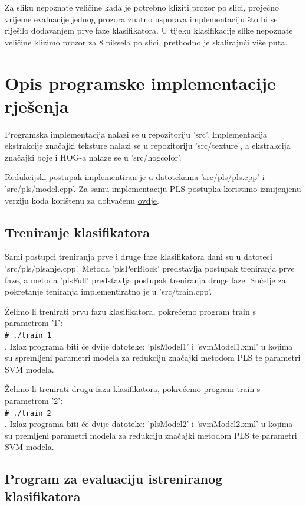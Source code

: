 \documentclass[seminar]{fer}
\newcommand{\shellcmd}[1]{\\\indent\indent\texttt{\footnotesize\# #1}\\}
\begin{document}
Za sliku nepoznate veličine kada je potrebno kliziti prozor po slici, proječno vrijeme evaluacije jednog prozora znatno usporava implementaciju što bi se riješilo dodavanjem prve faze klasifikatora. U tijeku klasifikacije slike nepoznate veličine klizimo prozor za $8$ piksela po slici, prethodno je skalirajući više puta.

\chapter{Opis programske implementacije rješenja}
Programska implementacija nalazi se u repozitoriju 'src'. Implementacija ekstrakcije značajki teksture nalazi se u repozitoriju 'src/texture', a ekstrakcija značajki boje i HOG-a nalaze se u 'src/hogcolor'. 

Redukcijski postupak implementiran je u datotekama 'src/pls/pls.cpp' i 'src/pls/model.cpp'. Za samu implementaciju PLS postupka koristimo izmijenjenu verziju koda korištenu za \cite{Schwartz} dohvaćenu   \href{http://homepages.dcc.ufmg.br/~william/softwares.html#PLSNipals}{ovdje}.

\section{Treniranje klasifikatora}

Sami postupci treniranja prve i druge faze klasifikatora dani su u datoteci 'src/pls/plsanje.cpp'. Metoda 'plsPerBlock' predstavlja postupak treniranja prve faze, a metoda 'plsFull' predstavlja postupak treniranja druge faze. Sučelje za pokretanje teniranja implementiratno je u 'src/train.cpp'.	

Želimo li trenirati prvu fazu klasifikatora, pokrećemo program train s parametrom '1': \shellcmd{./train 1}. 
Izlaz programa biti će dvije datoteke: 'plsModel1' i 'svmModel1.xml' u kojima su spremljeni parametri modela za redukciju značajki metodom PLS te parametri SVM modela.

Želimo li trenirati drugu fazu klasifikatora, pokrećemo program train s parametrom '2': \shellcmd{./train 2}. Izlaz programa biti će dvije datoteke: 'plsModel2' i 'svmModel2.xml' u kojima su premljeni parametri modela za redukciju značajki metodom PLS te parametri SVM modela. 

\section{Program za evaluaciju istreniranog klasifikatora}
\end{document}
